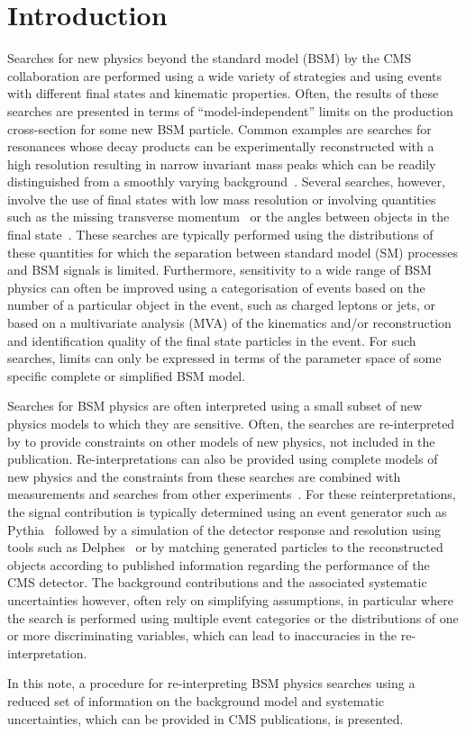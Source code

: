 \section{Introduction}
\label{sec:intro}

Searches for new physics beyond the standard model (BSM) by the CMS collaboration are performed using a wide variety of 
strategies and using events with different final states and kinematic properties.  Often, 
the results of these searches are presented in terms of ``model-independent'' limits on the production 
cross-section for some new BSM particle. Common examples are searches for resonances whose decay products 
can be experimentally reconstructed with a high resolution resulting in narrow invariant mass peaks which can be readily distinguished from 
a smoothly varying background~\cite{Khachatryan:2016yec}. Several searches, however, involve the use of final states with low mass resolution or involving 
quantities such as the missing transverse momentum~\cite{Khachatryan:2011tk,Khachatryan:2016mdm} or the angles between objects in the final state~\cite{Khachatryan:2015pua}. 
These searches are typically performed using the 
distributions of these quantities for which the separation between standard model (SM) processes and BSM signals is limited. Furthermore, 
sensitivity to a wide range of BSM physics can often be improved using a categorisation of events based on the number of a particular 
object in the event, such as charged leptons or jets, or based on a multivariate analysis (MVA) of the kinematics and/or reconstruction and 
identification quality of the final state particles in the event. For such searches, limits can only be expressed in terms of the 
parameter space of some specific complete or simplified BSM model.

Searches for BSM physics are often interpreted using a small subset of new physics 
models to which they are sensitive. Often, the searches are re-interpreted by 
to provide constraints on other models of new physics, not included in the publication.
Re-interpretations can also be provided using complete models of new physics and the constraints from 
these searches are combined with measurements and searches from other experiments~\cite{mastercode}. 
For these reinterpretations, the signal contribution is typically determined using an event generator 
such as {\sc Pythia}~\cite{pythia} followed by a simulation of the detector 
response and resolution using tools such as {\sc Delphes}~\cite{delphes} or by matching generated particles to
the reconstructed objects according to published information regarding the performance of the CMS detector. 
The background contributions and the associated systematic uncertainties however, often rely
on simplifying assumptions, in particular where the search is performed using multiple event categories or 
the distributions of one or more discriminating variables, which can lead to inaccuracies in the re-interpretation. 

In this note, a procedure for re-interpreting BSM physics searches using a reduced set of information
on the background model and systematic uncertainties, which can be provided in CMS publications, is presented.



